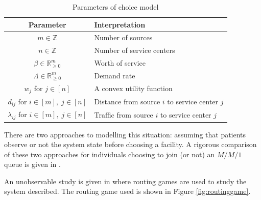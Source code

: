 \documentclass[a4paper,11pt]{article}
\begin{document}
\begin{table}[!hbtp]
\begin{center}
\begin{tabular}{cl}
\toprule
Parameter & Interpretation\\
\midrule
$m\in\mathbb{Z}$& Number of sources\\
$n\in\mathbb{Z}$& Number of service centers\\
$\beta\in\mathbb{R}_{\geq 0}^{m}$& Worth of service\\
$\Lambda\in\mathbb{R}_{\geq 0}^{m}$& Demand rate\\
$w_j$ for $j\in[n]$& A convex utility function\\
$d_{ij}$ for $i\in[m],\;j\in[n]$& Distance from source $i$ to service center $j$\\
$\lambda_{ij}$ for $i\in[m],\;j\in[n]$& Traffic from source $i$ to service center $j$\\
\toprule
\end{tabular}
\caption{Parameters of choice model}\label{tab:parameters}
\end{center}
\end{table}

There are two approaches to modelling this situation: assuming that patients observe or not the system state before choosing a facility.
A rigorous comparison of these two approaches for individuals choosing to join (or not) an $M/M/1$ queue is given in \cite{shone2013comparisons}.

An unobservable study is given in \cite{Knight2013} where routing games \cite{Roughgarden2005} are used to study the system described.
The routing game used is shown in Figure \ref{fig:routinggame}.
\end{document}
